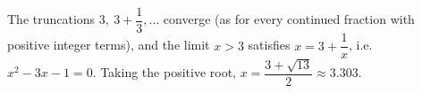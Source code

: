 The truncations $3,\ 3+\dfrac{1}{3},\dots$ converge (as for every continued fraction with positive integer terms), and the limit $x>3$ satisfies $x=3+\dfrac{1}{x}$, i.e. $x^2-3x-1=0$. Taking the positive root, $x=\boxed{\dfrac{3+\sqrt{13}}{2}}\approx3.303$.
